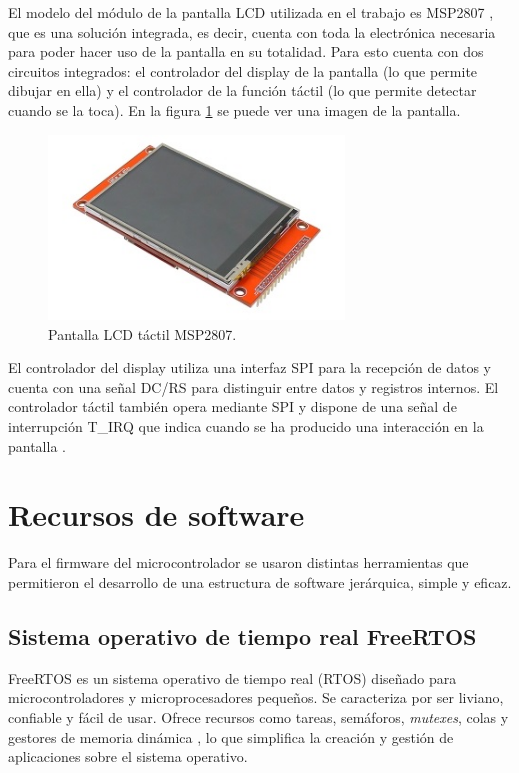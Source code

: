 El modelo del módulo de la pantalla LCD utilizada en el trabajo es MSP2807 \citep{MSP2807}, que es una solución integrada, es decir, cuenta con toda la electrónica necesaria para poder hacer uso de la pantalla en su totalidad. Para esto cuenta con dos circuitos integrados: el controlador del display de la pantalla (lo que permite dibujar en ella) y el controlador de la función táctil (lo que permite detectar cuando se la toca). En la figura \ref{fig:pantLCD} se puede ver una imagen de la pantalla.

\begin{figure}[H]
\centering
\includegraphics[width=0.7\textwidth]{./Figures/pant_LCD.png}
\caption{Pantalla LCD táctil MSP2807\protect\footnotemark.}
\label{fig:pantLCD}
\end{figure}


El controlador del display utiliza una interfaz SPI para la recepción de datos y cuenta con una señal DC/RS para distinguir entre datos y registros internos. El controlador táctil también opera mediante SPI y dispone de una señal de interrupción T\_IRQ que indica cuando se ha producido una interacción en la pantalla \citep{MSP2807}.

\section{Recursos de software}

Para el firmware del microcontrolador se usaron distintas herramientas que permitieron el desarrollo de una estructura de software jerárquica, simple y eficaz.

\subsection{Sistema operativo de tiempo real FreeRTOS}

FreeRTOS es un sistema operativo de tiempo real (RTOS) diseñado para microcontroladores y microprocesadores pequeños. Se caracteriza por ser liviano, confiable y fácil de usar. Ofrece recursos como tareas, semáforos, \textit{mutexes}, colas y gestores de memoria dinámica \citep{WEBSITE:1}, lo que simplifica la creación y gestión de aplicaciones sobre el sistema operativo.

